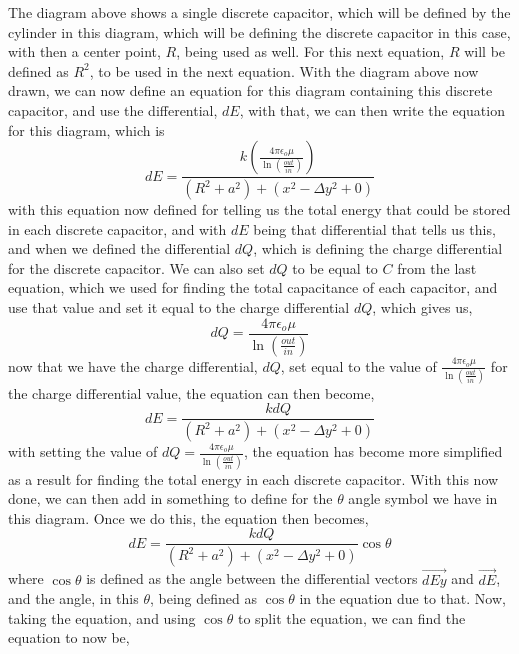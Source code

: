 \documentclass[]{article}
\begin{document}
\linebreak
\linebreak
The diagram above shows a single discrete capacitor, which will be defined by the cylinder in this diagram, which will be defining the discrete capacitor in this case, with then a center point, $R$, being used as well. For this next equation, $R$ will be defined as $R^2$, to be used in the next equation. With the diagram above now drawn, we can now define an equation for this diagram containing this discrete capacitor, and use the differential, $dE$, with that, we can then write the equation for this diagram, which is
\begin{equation}
dE = \frac{k(\frac{4\pi\epsilon_o\mu}{\ln(\frac{out}{in})})}{(R^2+a^2) + (x^2 - \Delta{y}^2+0)}
\end{equation}
with this equation now defined for telling us the total energy that could be stored in each discrete capacitor, and with $dE$ being that differential that tells us this, and when we defined the differential $dQ$, which is defining the charge differential for the discrete capacitor. We can also set $dQ$ to be equal to $C$ from the last equation, which we used for finding the total capacitance of each capacitor, and use that value and set it equal to the charge differential $dQ$, which gives us, 
\linebreak
\begin{equation}
dQ = \frac{4\pi\epsilon_o\mu}{\ln(\frac{out}{in})}
\end{equation}
\linebreak
now that we have the charge differential, $dQ$, set equal to the value of $\frac{4\pi\epsilon_o\mu}{\ln(\frac{out}{in})}$ for the charge differential value, the equation can then become,
\begin{equation}
dE = \frac{kdQ}{(R^2 + a^2) + (x^2 - \Delta{y}^2+0)} 
\end{equation}
with setting the value of $dQ = \frac{4\pi\epsilon_o\mu}{\ln(\frac{out}{in})}$, the equation has become more simplified as a result for finding the total energy in each discrete capacitor. With this now done, we can then add in something to define for the $\theta$ angle symbol we have in this diagram. Once we do this, the equation then becomes,
\begin{equation}
dE = \frac{kdQ}{(R^2+a^2) + (x^2 - \Delta{y}^2 + 0)} \cos\theta
\end{equation}
where $\cos\theta$ is defined as the angle between the differential vectors $\vec{dEy}$ and $\vec{dE}$, and the angle, in this $\theta$, being defined as $\cos\theta$ in the equation due to that. Now, taking the equation, and using $\cos\theta$ to split the equation, we can find the equation to now be, 
\end{document}
